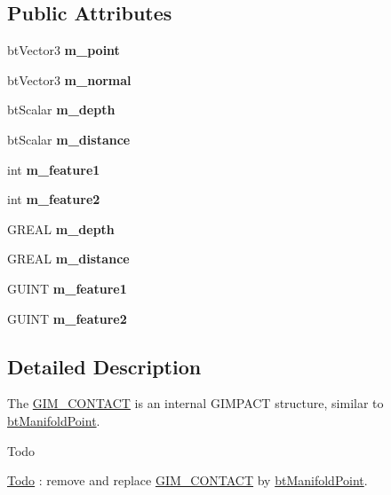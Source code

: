 \subsection*{Public Attributes}
\begin{DoxyCompactItemize}
\item 
\mbox{\label{classGIM__CONTACT_a3bd25b63998fe5054600212a47792213}} 
bt\+Vector3 {\bfseries m\+\_\+point}
\item 
\mbox{\label{classGIM__CONTACT_aade2c99787d5fe1776cbb44e4bc76bc5}} 
bt\+Vector3 {\bfseries m\+\_\+normal}
\item 
\mbox{\label{classGIM__CONTACT_a4dd7e6233dcc7e7d0ba648bff6243dac}} 
bt\+Scalar {\bfseries m\+\_\+depth}
\item 
\mbox{\label{classGIM__CONTACT_aa0db10be79e07464f41702ed2781217b}} 
bt\+Scalar {\bfseries m\+\_\+distance}
\item 
\mbox{\label{classGIM__CONTACT_a286d04555cb581fd9744634ea9479cdf}} 
int {\bfseries m\+\_\+feature1}
\item 
\mbox{\label{classGIM__CONTACT_af9389e6d7e28d723e93233f3423e0984}} 
int {\bfseries m\+\_\+feature2}
\item 
\mbox{\label{classGIM__CONTACT_a4dd7e6233dcc7e7d0ba648bff6243dac}} 
G\+R\+E\+AL {\bfseries m\+\_\+depth}
\item 
\mbox{\label{classGIM__CONTACT_aa0db10be79e07464f41702ed2781217b}} 
G\+R\+E\+AL {\bfseries m\+\_\+distance}
\item 
\mbox{\label{classGIM__CONTACT_a286d04555cb581fd9744634ea9479cdf}} 
G\+U\+I\+NT {\bfseries m\+\_\+feature1}
\item 
\mbox{\label{classGIM__CONTACT_af9389e6d7e28d723e93233f3423e0984}} 
G\+U\+I\+NT {\bfseries m\+\_\+feature2}
\end{DoxyCompactItemize}


\subsection{Detailed Description}
The \hyperlink{classGIM__CONTACT}{G\+I\+M\+\_\+\+C\+O\+N\+T\+A\+CT} is an internal G\+I\+M\+P\+A\+CT structure, similar to \hyperlink{classbtManifoldPoint}{bt\+Manifold\+Point}. \begin{DoxyRefDesc}{Todo}
\item[\hyperlink{todo__todo000025}{Todo}]\+: remove and replace \hyperlink{classGIM__CONTACT}{G\+I\+M\+\_\+\+C\+O\+N\+T\+A\+CT} by \hyperlink{classbtManifoldPoint}{bt\+Manifold\+Point}. \end{DoxyRefDesc}


